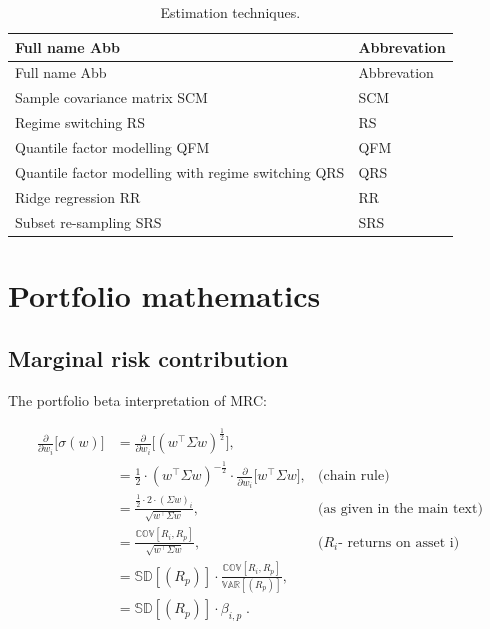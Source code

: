 \documentclass[
]{article}
\begin{document}
\begin{longtable}[]{@{}ll@{}}
\caption{\label{tab:esttech} Estimation techniques.}\tabularnewline
\toprule
Full name \textbar{} Abb & Abbrevation \textbar{}\tabularnewline
\midrule
\endfirsthead
\toprule
Full name \textbar{} Abb & Abbrevation \textbar{}\tabularnewline
\midrule
\endhead
Sample covariance matrix \textbar{} SCM & SCM \textbar{}\tabularnewline
Regime switching \textbar{} RS & RS \textbar{}\tabularnewline
Quantile factor modelling \textbar{} QFM & QFM \textbar{}\tabularnewline
Quantile factor modelling with regime switching \textbar{} QRS & QRS \textbar{}\tabularnewline
Ridge regression \textbar{} RR & RR \textbar{}\tabularnewline
Subset re-sampling \textbar{} SRS & SRS \textbar{}\tabularnewline
\bottomrule
\end{longtable}

\hypertarget{portfolio-mathematics}{%
\section{Portfolio mathematics}\label{portfolio-mathematics}}

\hypertarget{mrcapp}{%
\subsection{Marginal risk contribution}\label{mrcapp}}

The portfolio beta interpretation of MRC:

\begin{align*}
\frac{\partial}{\partial w_i} \Big [ \sigma(w) \Big ] & = \frac{\partial}{\partial w_i}  \Big [ (w^\intercal \Sigma w)^{\frac{1}{2}} \Big ], & \\
& = \frac{1}{2} \cdot (w^\intercal \Sigma w)^{-\frac{1}{2}} \cdot \frac{\partial}{\partial w_i} \Big [ w^\intercal \Sigma w \Big ], &  \text{(chain rule)} \\
& = \frac{\frac{1}{2}\cdot 2 \cdot (\Sigma w)_i}{\sqrt{w^\intercal \Sigma w}}, &  \text{(as given in the main text)} \\
& = \frac{\mathbb{COV}[R_i, R_p]}{\sqrt{w^\intercal \Sigma w}}, &   \text{($R_i$- returns on asset i)} \\
& = \mathbb{SD}[(R_p)] \cdot  \frac{\mathbb{COV}[R_i, R_p]}{\mathbb{VAR}[(R_p)]}, & \\
& = \mathbb{SD}[(R_p)] \cdot \beta_{i, p}\;. &
\end{align*}
\end{document}
